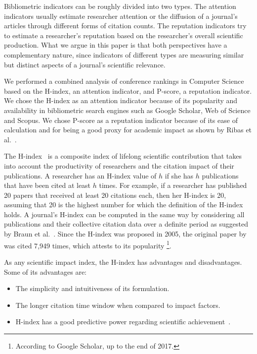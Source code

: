\documentclass[notitlepage]{svjour3}
\begin{document}
Bibliometric indicators can be roughly divided into two types. The attention indicators usually 
estimate researcher attention or the diffusion of a journal's articles through different 
forms of citation counts. 
The reputation indicators try to estimate a researcher's reputation based on the researcher's 
overall scientific production.
What we argue in this paper is that both perspectives have a complementary nature,
since indicators of different types are measuring similar but distinct aspects of
a journal's scientific relevance. 

We performed a combined analysis of conference rankings in Computer Science based on the H-index, an
attention indicator, and P-score, a reputation indicator. We chose the H-index as an attention 
indicator because of its popularity and availability in bibliometric search engines such as 
Google Scholar, Web of Science and Scopus. We chose P-score as a reputation indicator because 
of its ease of calculation and for being a good proxy for academic impact as shown by Ribas et 
al.~\cite{Ribas2015a}. 

The H-index~\cite{Hirsch2005} is a composite index of lifelong scientific contribution that takes 
into account the productivity of researchers and the citation impact of their publications.
A researcher has an H-index value of $ h $ if she has $ h $ publications that have been cited at 
least $ h $ times. For example, if a researcher has published 20 papers that received at least 20 
citations each, then her H-index is 20, assuming that 20 is the highest number for which the 
definition of the H-index holds. A journal's H-index can be computed 
in the same way by considering all publications and their collective citation data over a 
definite period as suggested by Braun et al.~\cite{Braun2006}.
Since the H-index was proposed in 2005, the original paper by~\cite{Hirsch2005} was 
cited 7,949 times, which attests to its popularity 
\footnote{According to Google Scholar, up to the end of 2017.}.

As any scientific impact index, the H-index has advantages and disadvantages. 
Some of its advantages are:

\begin{itemize}
\item The simplicity and intuitiveness of its formulation.
\item The longer citation time window when compared to impact factors.
\item H-index has a good predictive power regarding scientific achievement~\cite{Bornmann2005,Hirsch2007}.
\end{itemize}
\end{document}
